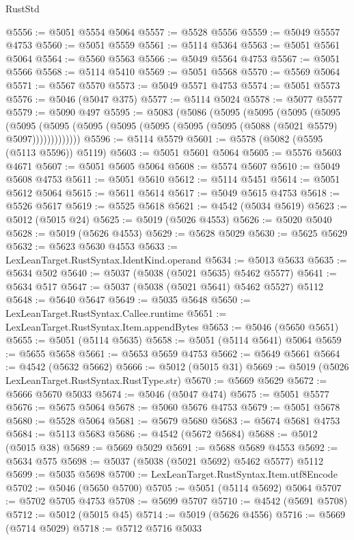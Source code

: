 \begin{lexlean}{RustStd}
\begin{coremodule}
@5556 := @5051 @5554 @5064
@5557 := @5528 @5556
@5559 := @5049 @5557 @4753
@5560 := @5051 @5559
@5561 := @5114 @5364
@5563 := @5051 @5561 @5064
@5564 := @5560 @5563
@5566 := @5049 @5564 @4753
@5567 := @5051 @5566
@5568 := @5114 @5410
@5569 := @5051 @5568
@5570 := @5569 @5064
@5571 := @5567 @5570
@5573 := @5049 @5571 @4753
@5574 := @5051 @5573
@5576 := @5046 (@5047 @375)
@5577 := @5114 @5024
@5578 := @5077 @5577
@5579 := @5090 @497
@5595 := @5083
    (@5086
      (@5095
        (@5095
          (@5095
            (@5095
              (@5095
                (@5095 (@5095 (@5095 (@5095 (@5095 (@5095 (@5088 (@5021 @5579) @5097)))))))))))))
@5596 := @5114 @5579
@5601 := @5578 (@5082 (@5595 (@5113 @5596)) @5119)
@5603 := @5051 @5601 @5064
@5605 := @5576 @5603 @4671
@5607 := @5051 @5605 @5064
@5608 := @5574 @5607
@5610 := @5049 @5608 @4753
@5611 := @5051 @5610
@5612 := @5114 @5451
@5614 := @5051 @5612 @5064
@5615 := @5611 @5614
@5617 := @5049 @5615 @4753
@5618 := @5526 @5617
@5619 := @5525 @5618
@5621 := @4542 (@5034 @5619)
@5623 := @5012 (@5015 @24)
@5625 := @5019 (@5026 @4553)
@5626 := @5020 @5040
@5628 := @5019 (@5626 @4553)
@5629 := @5628 @5029
@5630 := @5625 @5629
@5632 := @5623 @5630 @4553
@5633 := LexLeanTarget.RustSyntax.IdentKind.operand
@5634 := @5013 @5633
@5635 := @5634 @502
@5640 := @5037 (@5038 (@5021 @5635) @5462 @5577)
@5641 := @5634 @517
@5647 := @5037 (@5038 (@5021 @5641) @5462 @5527) @5112
@5648 := @5640 @5647
@5649 := @5035 @5648
@5650 := LexLeanTarget.RustSyntax.Callee.runtime
@5651 := LexLeanTarget.RustSyntax.Item.appendBytes
@5653 := @5046 (@5650 @5651)
@5655 := @5051 (@5114 @5635)
@5658 := @5051 (@5114 @5641) @5064
@5659 := @5655 @5658
@5661 := @5653 @5659 @4753
@5662 := @5649 @5661
@5664 := @4542 (@5632 @5662)
@5666 := @5012 (@5015 @31)
@5669 := @5019 (@5026 LexLeanTarget.RustSyntax.RustType.str)
@5670 := @5669 @5629
@5672 := @5666 @5670 @5033
@5674 := @5046 (@5047 @474)
@5675 := @5051 @5577
@5676 := @5675 @5064
@5678 := @5060 @5676 @4753
@5679 := @5051 @5678
@5680 := @5528 @5064
@5681 := @5679 @5680
@5683 := @5674 @5681 @4753
@5684 := @5113 @5683
@5686 := @4542 (@5672 @5684)
@5688 := @5012 (@5015 @38)
@5689 := @5669 @5029
@5691 := @5688 @5689 @4553
@5692 := @5634 @575
@5698 := @5037 (@5038 (@5021 @5692) @5462 @5577) @5112
@5699 := @5035 @5698
@5700 := LexLeanTarget.RustSyntax.Item.utf8Encode
@5702 := @5046 (@5650 @5700)
@5705 := @5051 (@5114 @5692) @5064
@5707 := @5702 @5705 @4753
@5708 := @5699 @5707
@5710 := @4542 (@5691 @5708)
@5712 := @5012 (@5015 @45)
@5714 := @5019 (@5626 @4556)
@5716 := @5669 (@5714 @5029)
@5718 := @5712 @5716 @5033

\end{coremodule}
\end{lexlean}
